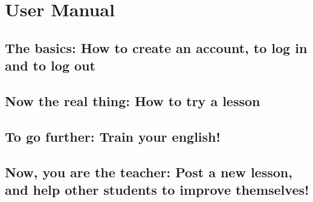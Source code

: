\section{User Manual}

\subsection{The basics: How to create an account, to log in and to log out}


\subsection{Now the real thing: How to try a lesson}


\subsection{To go further: Train your english!}

\subsection{Now, you are the teacher: Post a new lesson, and help other students to improve themselves!}


